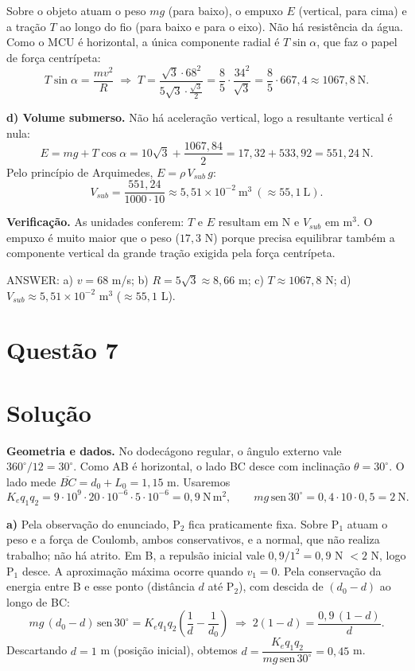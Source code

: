 \documentclass{article}%
\begin{document}
Sobre o objeto atuam o peso $mg$ (para baixo), o empuxo $E$ (vertical, para cima) e a tração $T$ ao longo do fio (para baixo e para o eixo). Não há resistência da água. Como o MCU é horizontal, a única componente radial é $T\sin\alpha$, que faz o papel de força centrípeta:
\[
T\sin\alpha=\frac{mv^2}{R}\;\Rightarrow\;
T=\frac{\sqrt3\cdot 68^2}{5\sqrt3\cdot\frac{\sqrt3}{2}}=\frac{8}{5}\cdot\frac{34^2}{\sqrt3}=\frac{8}{5}\cdot 667{,}4\approx 1067{,}8\ \text{N}.
\]

\textbf{d) Volume submerso.} Não há aceleração vertical, logo a resultante vertical é nula:
\[
E=mg+T\cos\alpha=10\sqrt3+\frac{1067{,}84}{2}=17{,}32+533{,}92=551{,}24\ \text{N}.
\]
Pelo princípio de Arquimedes, $E=\rho\, V_{sub}\, g$:
\[
V_{sub}=\frac{551{,}24}{1000\cdot 10}\approx 5{,}51\times10^{-2}\ \text{m}^3\ (\approx 55{,}1\ \text{L}).
\]

\textbf{Verificação.} As unidades conferem: $T$ e $E$ resultam em N e $V_{sub}$ em m$^3$. O empuxo é muito maior que o peso ($17{,}3$ N) porque precisa equilibrar também a componente vertical da grande tração exigida pela força centrípeta.

ANSWER: a) $v=68$ m/s; b) $R=5\sqrt3\approx 8{,}66$ m; c) $T\approx 1067{,}8$ N; d) $V_{sub}\approx 5{,}51\times10^{-2}$ m$^3$ ($\approx 55{,}1$ L).%
\newpage%
\section*{Questão 7}

\section*{Solução}

\textbf{Geometria e dados.} No dodecágono regular, o ângulo externo vale $360^\circ/12=30^\circ$. Como AB é horizontal, o lado BC desce com inclinação $\theta=30^\circ$. O lado mede $\overline{BC}=d_0+L_0=1{,}15$ m. Usaremos
\[
K_e q_1 q_2 = 9\cdot 10^{9}\cdot 20\cdot 10^{-6}\cdot 5\cdot 10^{-6}=0{,}9\ \text{N}\,\text{m}^2,\qquad mg\,\text{sen}\,30^\circ = 0{,}4\cdot 10\cdot 0{,}5 = 2\ \text{N}.
\]

\textbf{a)} Pela observação do enunciado, P$_2$ fica praticamente fixa. Sobre P$_1$ atuam o peso e a força de Coulomb, ambos conservativos, e a normal, que não realiza trabalho; não há atrito. Em B, a repulsão inicial vale $0{,}9/1^2=0{,}9$ N $<2$ N, logo P$_1$ desce. A aproximação máxima ocorre quando $v_1=0$. Pela conservação da energia entre B e esse ponto (distância $d$ até P$_2$), com descida de $(d_0-d)$ ao longo de BC:
\[
mg\,(d_0-d)\,\text{sen}\,30^\circ = K_e q_1 q_2\left(\frac{1}{d}-\frac{1}{d_0}\right)
\;\Rightarrow\; 2(1-d)=\frac{0{,}9\,(1-d)}{d}.
\]
Descartando $d=1$ m (posição inicial), obtemos $d=\dfrac{K_e q_1 q_2}{mg\,\text{sen}\,30^\circ}=0{,}45$ m.
\end{document}
